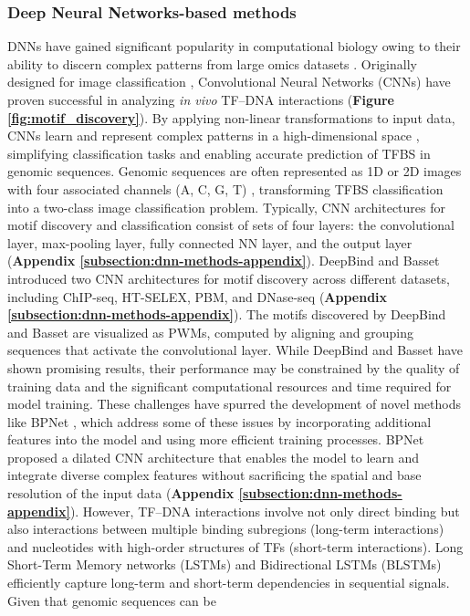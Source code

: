 \documentclass[a4paper, titlepage, openright]{book}
\begin{document}
\subsubsection{Deep Neural Networks-based methods}
DNNs have gained significant popularity in computational biology \citep{talukder2021interpretation, zeng2020integrating, singh2016deepchrome, singh2019predicting, zeng2018prediction, kelley2018sequential, li2019deeptact, yin2019deephistone, manzanarez2018model} owing to their ability to discern complex patterns \citep{park2015deep} from large omics datasets \citep{zhang2019deep}. Originally designed for image classification  \citep{lecun2015deep, sainath2013improvements, vu2017use}, Convolutional Neural Networks (CNNs) \citep{lecun2015deep} have proven successful in analyzing \emph{in vivo} TF–DNA interactions \citep{alipanahi2015predicting, zhou2015predicting, kelley2016basset, zeng2016convolutional} (\textbf{Figure \ref{fig:motif_discovery}}). By applying non-linear transformations to input data, CNNs learn and represent complex patterns in a high-dimensional space \citep{bengio2013representation}, simplifying classification tasks and enabling accurate prediction of TFBS in genomic sequences. Genomic sequences are often represented as 1D or 2D images with four associated channels (A, C, G, T) \citep{zeng2016convolutional}, transforming TFBS classification into a two-class image classification problem. Typically, CNN architectures for motif discovery and classification consist of sets of four layers: the convolutional layer, max-pooling layer, fully connected NN layer, and the output layer \citep{zeng2016convolutional} (\textbf{Appendix \ref{subsection:dnn-methods-appendix}}). DeepBind \citep{alipanahi2015predicting} and Basset \citep{kelley2016basset} introduced two CNN architectures for motif discovery across different datasets, including ChIP-seq, HT-SELEX, PBM, and DNase-seq (\textbf{Appendix \ref{subsection:dnn-methods-appendix}}). The motifs discovered by DeepBind and Basset are visualized as PWMs, computed by aligning and grouping sequences that activate the convolutional layer. While DeepBind and Basset have shown promising results, their performance may be constrained by the quality of training data and the significant computational resources and time required for model training. These challenges have spurred the development of novel methods like BPNet \citep{avsec2021base}, which address some of these issues by incorporating additional features into the model and using more efficient training processes. BPNet proposed a dilated CNN architecture that enables the model to learn and integrate diverse complex features without sacrificing the spatial and base resolution of the input data (\textbf{Appendix \ref{subsection:dnn-methods-appendix}}). However, TF–DNA interactions involve not only direct binding but also interactions between multiple binding subregions (long-term interactions) and nucleotides with high-order structures of TFs (short-term interactions). Long Short-Term Memory networks (LSTMs) \citep{hochreiter1997long} and Bidirectional LSTMs (BLSTMs) efficiently capture long-term and short-term dependencies in sequential signals. Given that genomic sequences can be 
\end{document}
